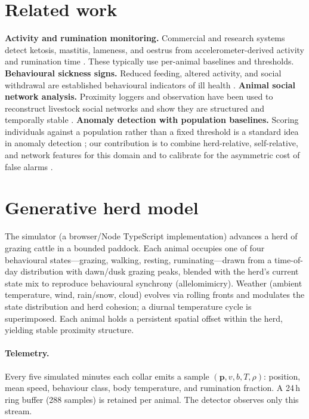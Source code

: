 \documentclass[11pt]{article}
\begin{document}
\section{Related work}
\textbf{Activity and rumination monitoring.} Commercial and research systems
detect ketosis, mastitis, lameness, and oestrus from accelerometer-derived
activity and rumination time \citep{stangaferro2016ketosis,rutten2013economic}.
These typically use per-animal baselines and thresholds. \textbf{Behavioural
sickness signs.} Reduced feeding, altered activity, and social withdrawal are
established behavioural indicators of ill health
\citep{weary2009painful,proudfoot2012social}. \textbf{Animal social network
analysis.} Proximity loggers and observation have been used to reconstruct
livestock social networks and show they are structured and temporally stable
\citep{boyland2016social,croft2008exploring,farine2015constructing}. \textbf{
Anomaly detection with population baselines.} Scoring individuals against a
population rather than a fixed threshold is a standard idea in anomaly detection
\citep{chandola2009anomaly}; our contribution is to combine herd-relative,
self-relative, and network features for this domain and to calibrate for the
asymmetric cost of false alarms \citep{king2001logistic}.

\section{Generative herd model}
The simulator (a browser/Node TypeScript implementation) advances a herd of
grazing cattle in a bounded paddock. Each animal occupies one of four behavioural
states---grazing, walking, resting, ruminating---drawn from a time-of-day
distribution with dawn/dusk grazing peaks, blended with the herd's current state
mix to reproduce behavioural synchrony (allelomimicry). Weather (ambient
temperature, wind, rain/snow, cloud) evolves via rolling fronts and modulates the
state distribution and herd cohesion; a diurnal temperature cycle is
superimposed. Each animal holds a persistent spatial offset within the herd,
yielding stable proximity structure.

\paragraph{Telemetry.} Every five simulated minutes each collar emits a sample
$(\mathbf{p}, v, b, T, \rho)$: position, mean speed, behaviour class, body
temperature, and rumination fraction. A 24\,h ring buffer (288 samples) is
retained per animal. The detector observes only this stream.
\end{document}
